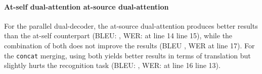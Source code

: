 \documentclass[11pt]{article}
\theoremstyle{plain}
\theoremstyle{definition}
\newcommand{\var}[1]{\texttt{#1}}
\begin{document}
\paragraph{At-self dual-attention \vs at-source dual-attention}
For the parallel dual-decoder, the at-source dual-attention produces better results than the at-self counterpart (BLEU:  \vs , WER:  \vs  at line 14 \vs line 15), while the combination of both does not improve the results (BLEU , WER  at line 17). For the \var{concat} merging, using both yields better results in terms of translation but slightly hurts the recognition task (BLEU:  \vs , WER:  \vs  at line 16 \vs line 13). 





\begin{figure}[!tb]
\centering
\begin{subfigure}[b]{.5\textwidth}
    \centering
\end{subfigure}
\end{figure}
\end{document}
